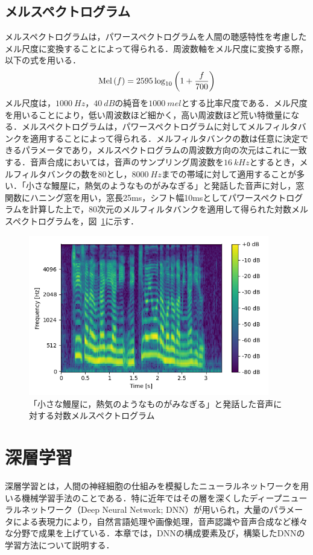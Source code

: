 \documentclass[12pt]{jarticle}
\numberwithin{equation}{section}    %
\numberwithin{figure}{section}      %
\numberwithin{table}{section}      %
\begin{document}
\subsection{メルスペクトログラム}
メルスペクトログラムは，パワースペクトログラムを人間の聴感特性を考慮したメル尺度に変換することによって得られる．周波数軸をメル尺度に変換する際，以下の式を用いる．
\begin{equation}
    \text{Mel}\left(f\right) = 2595\log_{10} \left(1 + \frac{f}{700}\right)
\end{equation}
メル尺度は，$\SI[]{1000}{Hz}$，$\SI[]{40}{dB}$の純音を$\SI[]{1000}{mel}$とする比率尺度である．メル尺度を用いることにより，低い周波数ほど細かく，高い周波数ほど荒い特徴量になる．メルスペクトログラムは，パワースペクトログラムに対してメルフィルタバンクを適用することによって得られる．メルフィルタバンクの数は任意に決定できるパラメータであり，メルスペクトログラムの周波数方向の次元はこれに一致する．音声合成においては，音声のサンプリング周波数を$\SI[]{16}{kHz}$とするとき，メルフィルタバンクの数を80とし，$\SI[]{8000}{Hz}$までの帯域に対して適用することが多い．「小さな鰻屋に，熱気のようなものがみなぎる」と発話した音声に対し，窓関数にハニング窓を用い，窓長25ms，シフト幅10msとしてパワースペクトログラムを計算した上で，80次元のメルフィルタバンクを適用して得られた対数メルスペクトログラムを，図~\ref{sec2:fig:melspectrogram}に示す．
\begin{figure}[bt]
    \centering
    \includegraphics[height=70mm]{./figure/sec2/melspectrogram.png}
    \caption{「小さな鰻屋に，熱気のようなものがみなぎる」と発話した音声に対する対数メルスペクトログラム}
    \label{sec2:fig:melspectrogram}
\end{figure}

\clearpage

\section{深層学習}
深層学習とは，人間の神経細胞の仕組みを模擬したニューラルネットワークを用いる機械学習手法のことである．特に近年ではその層を深くしたディープニューラルネットワーク（Deep Neural Network; DNN）が用いられ，大量のパラメータによる表現力により，自然言語処理や画像処理，音声認識や音声合成など様々な分野で成果を上げている．本章では，DNNの構成要素及び，構築したDNNの学習方法について説明する．
\end{document}
